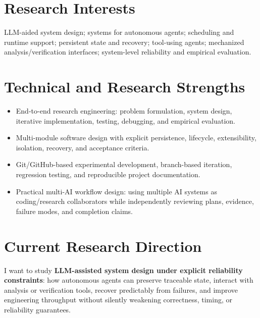 \documentclass[10pt,a4paper]{article}
\begin{document}
\section{Research Interests}
LLM-aided system design; systems for autonomous agents; scheduling and runtime support; persistent state and recovery; tool-using agents; mechanized analysis/verification interfaces; system-level reliability and empirical evaluation.

\section{Technical and Research Strengths}
\begin{itemize}
  \item End-to-end research engineering: problem formulation, system design, iterative implementation, testing, debugging, and empirical evaluation.
  \item Multi-module software design with explicit persistence, lifecycle, extensibility, isolation, recovery, and acceptance criteria.
  \item Git/GitHub-based experimental development, branch-based iteration, regression testing, and reproducible project documentation.
  \item Practical multi-AI workflow design: using multiple AI systems as coding/research collaborators while independently reviewing plans, evidence, failure modes, and completion claims.
\end{itemize}

\section{Current Research Direction}
I want to study \textbf{LLM-assisted system design under explicit reliability constraints}: how autonomous agents can preserve traceable state, interact with analysis or verification tools, recover predictably from failures, and improve engineering throughput without silently weakening correctness, timing, or reliability guarantees.
\end{document}
